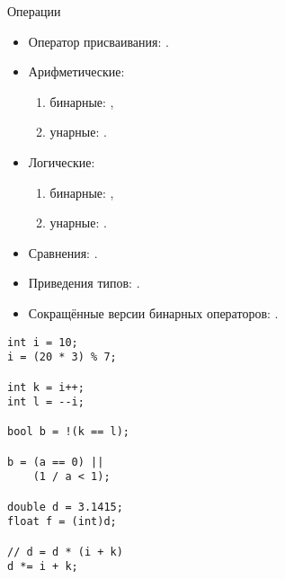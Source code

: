 \documentclass[aspectration=1610,t]{beamer}
\begin{document}
\begin{frame}[fragile]{Операции}
\begin{minipage}{.59\textwidth}
    \begin{itemize}
        \item Оператор присваивания: \code{=}.
        \item Арифметические:
        \begin{enumerate}
            \item бинарные: \code{+ - * / \%},
            \item унарные:  \code{++ {-}{-}}.
        \end{enumerate}
        \item Логические:
        \begin{enumerate}
            \item бинарные:  \code{\&\& ||},
            \item унарные:   \code{!}. 
        \end{enumerate}
        \item Сравнения: \code{== != > < >= <=}.
        \item Приведения типов: .
        \item Сокращённые версии бинарных операторов:
            \code{+= -= *= /= \%=}.
    \end{itemize}
\end{minipage}\hfill
\begin{minipage}{.4\textwidth}
\begin{lstlisting}
int i = 10;
i = (20 * 3) % 7;

int k = i++;
int l = --i;

bool b = !(k == l);

b = (a == 0) ||
    (1 / a < 1); 

double d = 3.1415;
float f = (int)d;

// d = d * (i + k)
d *= i + k;
\end{lstlisting}
\end{minipage}
\end{frame}
\end{document}
